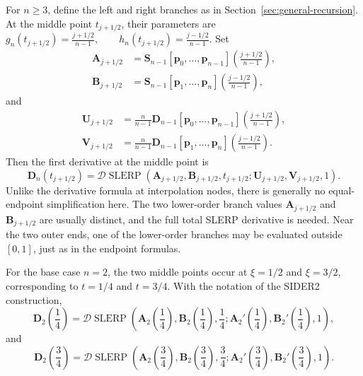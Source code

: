 \documentclass[a4paper,11pt]{article}
\newcommand{\bp}{\mathbf{p}}
\newcommand{\bU}{\mathbf{U}}
\newcommand{\bV}{\mathbf{V}}
\newcommand{\bA}{\mathbf{A}}
\newcommand{\bB}{\mathbf{B}}
\newcommand{\bD}{\mathbf{D}}
\numberwithin{equation}{section}
\theoremstyle{plain}
\theoremstyle{definition}
\theoremstyle{remark}
\newcommand{\slerp}{\operatorname{SLERP}}
\begin{document}
For \(n\geq3\), define the left and right branches as in Section~\ref{sec:general-recursion}.  At the middle point \(t_{j+1/2}\), their parameters are
\(g_n(t_{j+1/2})=\frac{j+1/2}{n-1},\qquad h_n(t_{j+1/2})=\frac{j-1/2}{n-1}.\)
Set
\[
\begin{aligned}
        \bA_{j+1/2}
        &=
        \mathbf{S}_{n-1}[\bp_0,\ldots,\bp_{n-1}]
        \!\left(\frac{j+1/2}{n-1}\right),\\
        \bB_{j+1/2}
        &=
        \mathbf{S}_{n-1}[\bp_1,\ldots,\bp_n]
        \!\left(\frac{j-1/2}{n-1}\right),
\end{aligned}
\]
and
\[
\begin{aligned}
        \bU_{j+1/2}
        &=
        \frac{n}{n-1}
        \bD_{n-1}[\bp_0,\ldots,\bp_{n-1}]
        \!\left(\frac{j+1/2}{n-1}\right),\\
        \bV_{j+1/2}
        &=
        \frac{n}{n-1}
        \bD_{n-1}[\bp_1,\ldots,\bp_n]
        \!\left(\frac{j-1/2}{n-1}\right).
\end{aligned}
\]
Then the first derivative at the middle point is
\begin{equation}
\label{eq:middle-point-general}
\boxed{
        \bD_n\!\left(t_{j+1/2}\right)
        =
        \mathcal{D}\slerp
        \left(
        \bA_{j+1/2},\bB_{j+1/2},t_{j+1/2};
        \bU_{j+1/2},\bV_{j+1/2},1
        \right).
}
\end{equation}
Unlike the derivative formula at interpolation nodes, there is generally no equal-endpoint simplification here.  The two lower-order branch values \(\bA_{j+1/2}\) and \(\bB_{j+1/2}\) are usually distinct, and the full total SLERP derivative is needed.  Near the two outer ends, one of the lower-order branches may be evaluated outside \([0,1]\), just as in the endpoint formulas.

For the base case \(n=2\), the two middle points occur at \(\xi=1/2\) and \(\xi=3/2\), corresponding to \(t=1/4\) and \(t=3/4\).  With the notation of the SIDER2 construction,
\[
        \bD_2\!\left(\frac14\right)
        =
        \mathcal{D}\slerp
        \left(
        \bA_2\!\left(\frac14\right),\bB_2\!\left(\frac14\right),\frac14;
        \bA_2'\!\left(\frac14\right),\bB_2'\!\left(\frac14\right),1
        \right),
\]
and
\[
        \bD_2\!\left(\frac34\right)
        =
        \mathcal{D}\slerp
        \left(
        \bA_2\!\left(\frac34\right),\bB_2\!\left(\frac34\right),\frac34;
        \bA_2'\!\left(\frac34\right),\bB_2'\!\left(\frac34\right),1
        \right).
\]
\end{document}
